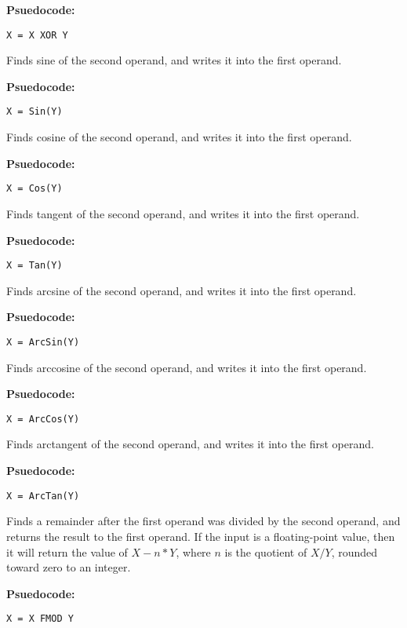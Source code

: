 \textbf{Psuedocode:}
\begin{verbatim}
X = X XOR Y
\end{verbatim}


Finds sine of the second operand, and writes it into the first operand.

\textbf{Psuedocode:}
\begin{verbatim}
X = Sin(Y)
\end{verbatim}


Finds cosine of the second operand, and writes it into the first operand.

\textbf{Psuedocode:}
\begin{verbatim}
X = Cos(Y)
\end{verbatim}


Finds tangent of the second operand, and writes it into the first operand.

\textbf{Psuedocode:}
\begin{verbatim}
X = Tan(Y)
\end{verbatim}


Finds arcsine of the second operand, and writes it into the first operand.

\textbf{Psuedocode:}
\begin{verbatim}
X = ArcSin(Y)
\end{verbatim}


Finds arccosine of the second operand, and writes it into the first operand.

\textbf{Psuedocode:}
\begin{verbatim}
X = ArcCos(Y)
\end{verbatim}


Finds arctangent of the second operand, and writes it into the first operand.

\textbf{Psuedocode:}
\begin{verbatim}
X = ArcTan(Y)
\end{verbatim}


Finds a remainder after the first operand was divided by the second operand, and returns the result to the first operand. If the input is a floating-point value, then it will return the value of $X - n * Y$, where $n$ is the quotient of $X / Y$, rounded toward zero to an integer.

\textbf{Psuedocode:}
\begin{verbatim}
X = X FMOD Y
\end{verbatim}


